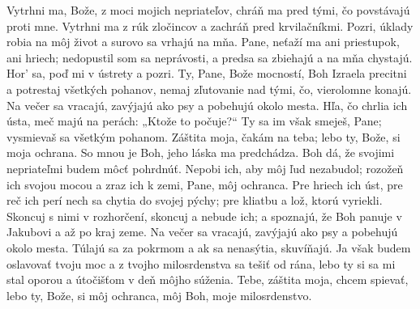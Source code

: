 Vytrhni ma, Bože, z moci mojich nepriateľov,
chráň ma pred tými, čo povstávajú proti mne.
\versseparator
Vytrhni ma z rúk zločincov
a zachráň pred krvilačníkmi.
\versseparator
Pozri, úklady robia na môj život
a surovo sa vrhajú na mňa.
\versseparator
Pane, neťaží ma ani priestupok, ani hriech;
nedopustil som sa neprávosti, a predsa sa zbiehajú a na mňa chystajú.
\versseparator
Hor’ sa, poď mi v ústrety a pozri.
Ty, Pane, Bože mocností, Boh Izraela
\versseparator
precitni a potrestaj všetkých pohanov,
nemaj zľutovanie nad tými, čo, vierolomne konajú.
\versseparator
Na večer sa vracajú, zavýjajú ako psy
a pobehujú okolo mesta.
\versseparator
Hľa, čo chrlia ich ústa,
meč majú na perách: „Ktože to počuje?“
\versseparator
Ty sa im však smeješ, Pane;
vysmievaš sa všetkým pohanom.
\versseparator
Záštita moja, čakám na teba;
lebo ty, Bože, si moja ochrana.
So mnou je Boh, jeho láska ma predchádza.
\versseparator
Boh dá, že svojimi nepriateľmi budem môcť pohrdnúť.
Nepobi ich, aby môj ľud nezabudol;
\versseparator
rozožeň ich svojou mocou
a zraz ich k zemi, Pane, môj ochranca.
\versseparator
Pre hriech ich úst, pre reč ich perí
nech sa chytia do svojej pýchy;
\versseparator
pre kliatbu a lož, ktorú vyriekli.
Skoncuj s nimi v rozhorčení,
skoncuj a nebude ich;
\versseparator
a spoznajú, že Boh panuje v Jakubovi a až po kraj zeme.
\versseparator
Na večer sa vracajú, zavýjajú ako psy
a pobehujú okolo mesta.
\versseparator
Túlajú sa za pokrmom
a ak sa nenasýtia, skuvíňajú.
\versseparator
Ja však budem oslavovať tvoju moc
a z tvojho milosrdenstva sa tešiť od rána,
\versseparator
lebo ty si sa mi stal oporou
a útočišťom v deň môjho súženia.
\versseparator
Tebe, záštita moja, chcem spievať,
lebo ty, Bože, si môj ochranca,
môj Boh, moje milosrdenstvo.